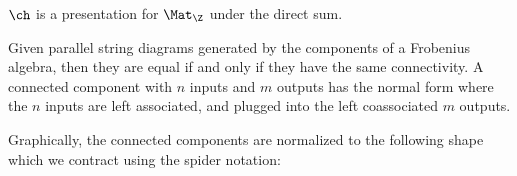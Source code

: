 \begin{lemma}
$\ch$ is a presentation for $\Mat_\Z$ under the direct sum.
\end{lemma}


\begin{lemma}
\label{lem:distfact}
\end{lemma}



\begin{lemma}
Given parallel string diagrams generated by the components of a Frobenius algebra, then they are equal if and only if they have the same connectivity.  A connected component with $n$ inputs and $m$ outputs has the normal form where the $n$ inputs are left associated, and plugged into the left coassociated $m$ outputs.


Graphically, the connected components are normalized to the following shape which we contract using the spider notation:


\end{lemma}
